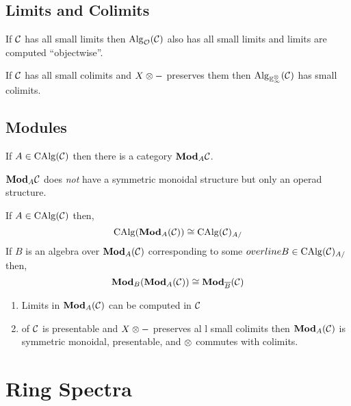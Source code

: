 \documentclass[12pt]{article}
\begin{document}
\subsection{Limits and Colimits}

\begin{theorem}
If $\mathcal{C}$ has all small limits then $\mathrm{Alg}_{\mathcal{O}}(\mathcal{C})$ also has all small limits and limits are computed ``objectwise''. 
\end{theorem}

\begin{theorem}
If $\mathcal{C}$ has all small colimits and $X \otimes -$ preserves them then $\mathrm{Alg}_{\mathbb{E}^\otimes_{\infty}}(\mathcal{C})$ has small colimits. 
\end{theorem}

\subsection{Modules}

\newcommand{\CAlg}{\mathrm{CAlg}}

If $A \in \CAlg(\C)$ then there is a category $\mathbf{Mod}_{A}{\mathcal{C}}$.

\begin{rmk}
$\mathbf{Mod}_{A}{\mathcal{C}}$ does \textit{not} have a symmetric monoidal structure but only an operad structure. 
\end{rmk}

\begin{theorem}
If $A \in \CAlg(\C)$ then,
\[ \CAlg(\Mod{A}{(\C)}) \cong \CAlg(\C)_{A / } \]
If $B$ is an algebra over $\mathbf{Mod}_{A}{(\mathcal{C})}$ corresponding to some $\\overline{B} \in \CAlg(\C)_{A / }$ then,
\[ \mathbf{Mod}_{B}{(\mathbf{Mod}_{A}{(\mathcal{C})})} \cong \mathbf{Mod}_{\overline{B}}{(\mathcal{C})} \]
\end{theorem}

\begin{theorem}
\begin{enumerate}
\item Limits in $\mathbf{Mod}_{A}{(\mathcal{C})}$ can be computed in $\mathcal{C}$
\item of $\mathcal{C}$ is presentable and $X \otimes -$ preserves al l small colimits then $\mathbf{Mod}_{A}{(\mathcal{C})}$ is symmetric monoidal, presentable, and $\otimes$ commutes with colimits. 
\end{enumerate}
\end{theorem}

\section{Ring Spectra}
\end{document}
